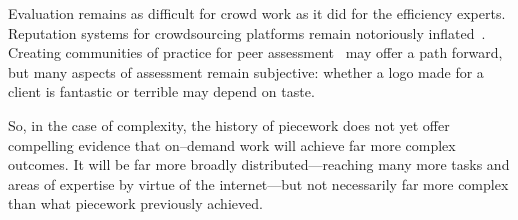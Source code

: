 \documentclass[trackingWork]{subfiles}
\begin{document}
Evaluation remains as difficult for crowd work as it did for the efficiency experts. 
Reputation systems for crowdsourcing platforms remain notoriously inflated~\cite{Horton2015a}.
Creating communities of practice for peer assessment~\cite{crowdguilds} may offer a path forward, but many aspects of assessment remain subjective: whether a logo made for a client is fantastic or terrible may depend on taste.

So, in the case of complexity, the history of piecework does not yet offer compelling evidence that on--demand work will achieve far more complex outcomes. 
It will be far more broadly distributed---reaching many more tasks and areas of expertise by virtue of the internet---but not necessarily far more complex than what piecework previously achieved.




\end{document}
